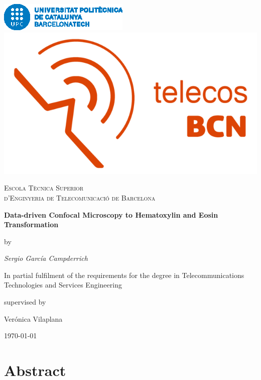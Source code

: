 \documentclass[a4paper,12pt,titlepage]{article}
\begin{document}
\begin{titlepage}
\centering

\includegraphics[height=0.07\textheight]{logo_barcelonatech}\hspace{0.5cm}
\includegraphics[height=0.07\textheight]{logo_telecos_2018}\par\vspace{1cm}

{\scshape\LARGE Escola Tècnica Superior \\ d'Enginyeria de Telecomunicació de Barcelona \par}\vspace{3mm}

{\huge\bfseries Data-driven Confocal Microscopy to Hematoxylin and Eosin Transformation\par}\vspace{2cm}

by\par
{\Large\itshape Sergio García Campderrich\par}
In partial fulfilment of the requirements for the degree in Telecommunications Technologies and Services Engineering\vfill

supervised by\par
Verónica Vilaplana

\vfill

{\large \today\par}
\end{titlepage}

\clearpage
\thispagestyle{empty}
\null\newpage

\section*{Abstract}
\lipsum[1]
\thispagestyle{empty}
\end{document}
